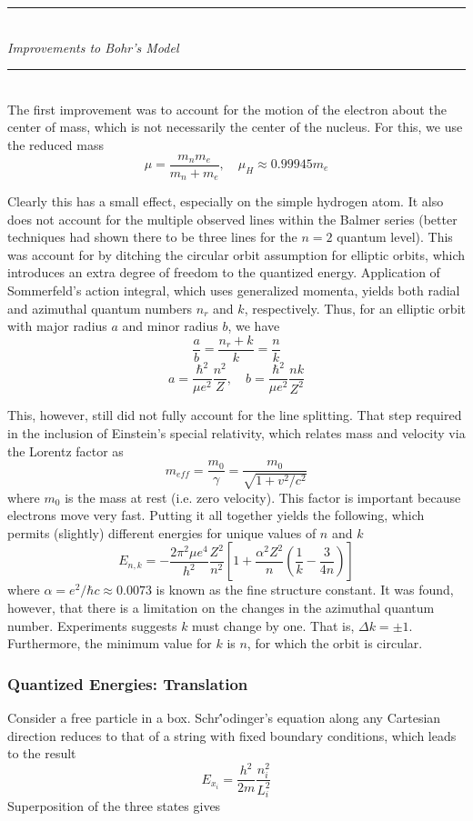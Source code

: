 \documentclass[11pt]{article}
\newcommand{\Header}[1]{\noindent\rule{\textwidth}{0.4pt}\\[0.3cm]\indent \large{\textit{#1}}\normalsize{}\\[-0.1cm]\noindent\rule{\textwidth}{0.4pt}}
\newcommand{\CenteredBoxed}[1]{\begin{center}\boxed{#1}\end{center}}
\begin{document}
\Header{Improvements to Bohr's Model}\\

The first improvement was to account for the motion of the electron about the center of mass, which is not necessarily the center of the nucleus. For this, we use the reduced mass
$$\mu = \frac{m_nm_e}{m_n+m_e},\quad \mu_H \approx 0.99945m_e$$

Clearly this has a small effect, especially on the simple hydrogen atom. It also does not account for the multiple observed lines within the Balmer series (better techniques had shown there to be three lines for the $n=2$ quantum level). This was account for by ditching the circular orbit assumption for elliptic orbits, which introduces an extra degree of freedom to the quantized energy. Application of Sommerfeld's action integral, which uses generalized momenta, yields both radial and azimuthal quantum numbers $n_r$ and $k$, respectively. Thus, for an elliptic orbit with major radius $a$ and minor radius $b$, we have
$$\frac{a}{b} = \frac{n_r+k}{k} = \frac{n}{k}$$
$$ a = \frac{\hbar^2}{\mu e^2}\frac{n^2}{Z},\quad b = \frac{\hbar^2}{\mu e^2}\frac{nk}{Z^2}$$

This, however, still did not fully account for the line splitting. That step required in the inclusion of Einstein's special relativity, which relates mass and velocity via the Lorentz factor as
$$m_{eff} = \frac{m_0}{\gamma} = \frac{m_0}{\sqrt{1+v^2/c^2}}$$
where $m_0$ is the mass at rest (i.e. zero velocity). This factor is important because electrons move very fast. Putting it all together yields the following, which permits (slightly) different energies for unique values of $n$ and $k$
$$E_{n,k} = -\frac{2\pi^2\mu e^4}{h^2}\frac{Z^2}{n^2}\left[1+\frac{\alpha^2Z^2}{n}\left(\frac{1}{k}-\frac{3}{4n}\right)\right]$$
where $\alpha = e^2/\hbar c\approx 0.0073$ is known as the fine structure constant. It was found, however, that there is a limitation on the changes in the azimuthal quantum number. Experiments suggests $k$ must change by one. That is, $\Delta k = \pm1$. Furthermore, the minimum value for $k$ is $n$, for which the orbit is circular.

\subsubsection{Quantized Energies: Translation}
Consider a free particle in a box. Schr{\''o}dinger's equation along any Cartesian direction reduces to that of a string with fixed boundary conditions, which leads to the result
$$E_{x_i} = \frac{h^2}{2m}\frac{n_i^2}{L_i^2}$$
Superposition of the three states gives
\CenteredBoxed{E_{trans} = \frac{h^2}{8m}\sum\frac{n_i^2}{L_i^2}}
\end{document}
